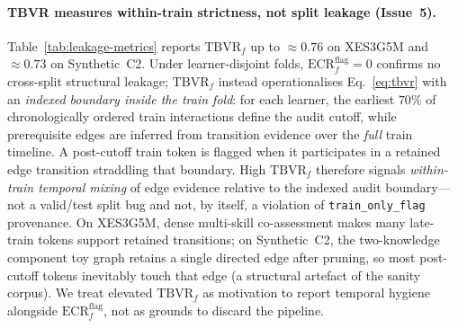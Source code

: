\documentclass[runningheads]{llncs}
\newcommand{\KC}{knowledge component}
\begin{document}
\paragraph{TBVR measures within-train strictness, not split leakage (Issue~5).}
Table~\ref{tab:leakage-metrics} reports $\mathrm{TBVR}_f$ up to
${\approx}0.76$ on XES3G5M and ${\approx}0.73$ on Synthetic~C2.
Under learner-disjoint folds, $\mathrm{ECR}^{\mathrm{flag}}_f{=}0$ confirms
no cross-split structural leakage; $\mathrm{TBVR}_f$ instead operationalises
Eq.~\eqref{eq:tbvr} with an \emph{indexed boundary inside the train
fold}: for each learner, the earliest $70\%$ of chronologically ordered
train interactions define the audit cutoff, while prerequisite edges are
inferred from transition evidence over the \emph{full} train timeline.
A post-cutoff train token is flagged when it participates in a retained
edge transition straddling that boundary.
High $\mathrm{TBVR}_f$ therefore signals \emph{within-train temporal
mixing} of edge evidence relative to the indexed audit boundary---not a
valid/test split bug and not, by itself, a violation of
\texttt{train\_only\_flag} provenance.
On XES3G5M, dense multi-skill co-assessment makes many late-train tokens
support retained transitions; on Synthetic~C2, the two-\KC{} toy graph
retains a single directed edge after pruning, so most post-cutoff tokens
inevitably touch that edge (a structural artefact of the sanity corpus).
We treat elevated $\mathrm{TBVR}_f$ as motivation to report temporal
hygiene alongside $\mathrm{ECR}^{\mathrm{flag}}_f$, not as grounds to
discard the pipeline.
\end{document}
